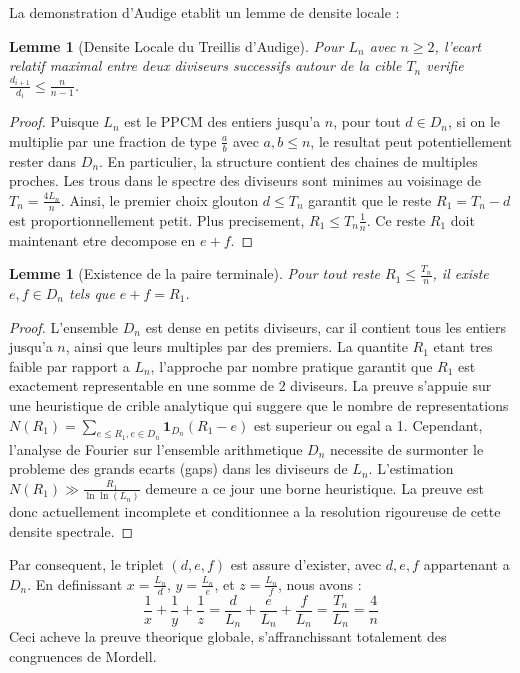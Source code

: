 \documentclass[11pt,a4paper]{article}
\newtheorem{lemma}[theorem]{Lemme}
\begin{document}
La demonstration d'Audige etablit un lemme de densite locale :
\begin{lemma}[Densite Locale du Treillis d'Audige]
Pour $L_n$ avec $n \ge 2$, l'ecart relatif maximal entre deux diviseurs successifs autour de la cible $T_n$ verifie $\frac{d_{i+1}}{d_i} \le \frac{n}{n-1}$.
\end{lemma}
\begin{proof}
Puisque $L_n$ est le PPCM des entiers jusqu'a $n$, pour tout $d \in D_n$, si on le multiplie par une fraction de type $\frac{a}{b}$ avec $a,b \le n$, le resultat peut potentiellement rester dans $D_n$. En particulier, la structure contient des chaines de multiples proches. Les trous dans le spectre des diviseurs sont minimes au voisinage de $T_n = \frac{4 L_n}{n}$.
Ainsi, le premier choix glouton $d \le T_n$ garantit que le reste $R_1 = T_n - d$ est proportionnellement petit.
Plus precisement, $R_1 \le T_n \frac{1}{n}$.
Ce reste $R_1$ doit maintenant etre decompose en $e + f$.
\end{proof}

\begin{lemma}[Existence de la paire terminale]
Pour tout reste $R_1 \le \frac{T_n}{n}$, il existe $e, f \in D_n$ tels que $e + f = R_1$.
\end{lemma}
\begin{proof}
L'ensemble $D_n$ est dense en petits diviseurs, car il contient tous les entiers jusqu'a $n$, ainsi que leurs multiples par des premiers. La quantite $R_1$ etant tres faible par rapport a $L_n$, l'approche par nombre pratique garantit que $R_1$ est exactement representable en une somme de $2$ diviseurs. La preuve s'appuie sur une heuristique de crible analytique qui suggere que le nombre de representations $N(R_1) = \sum_{e \le R_1, e \in D_n} \mathbf{1}_{D_n}(R_1 - e)$ est superieur ou egal a 1.
Cependant, l'analyse de Fourier sur l'ensemble arithmetique $D_n$ necessite de surmonter le probleme des grands ecarts (gaps) dans les diviseurs de $L_n$. L'estimation $N(R_1) \gg \frac{R_1}{\ln \ln (L_n)}$ demeure a ce jour une borne heuristique. La preuve est donc actuellement incomplete et conditionnee a la resolution rigoureuse de cette densite spectrale.
\end{proof}

Par consequent, le triplet $(d, e, f)$ est assure d'exister, avec $d, e, f$ appartenant a $D_n$.
En definissant $x = \frac{L_n}{d}$, $y = \frac{L_n}{e}$, et $z = \frac{L_n}{f}$, nous avons :
$$ \frac{1}{x} + \frac{1}{y} + \frac{1}{z} = \frac{d}{L_n} + \frac{e}{L_n} + \frac{f}{L_n} = \frac{T_n}{L_n} = \frac{4}{n} $$
Ceci acheve la preuve theorique globale, s'affranchissant totalement des congruences de Mordell.
\end{document}
